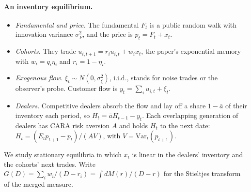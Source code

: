 \paragraph{An inventory equilibrium.}
\begin{itemize}[itemsep=1pt,topsep=2pt]
\item \emph{Fundamental and price.} The fundamental $F_t$ is a public random walk with innovation variance $\sigma_F^2$, and the price is $p_t=F_t+x_t$.
\item \emph{Cohorts.} They trade $u_{i,t+1}=r_iu_{i,t}+w_ix_t$, the paper's exponential memory with $w_i=q_i\eta_i$ and $r_i=1-\eta_i$.
\item \emph{Exogenous flow.} $\xi_t\sim N(0,\sigma_\xi^2)$, i.i.d., stands for noise trades or the observer's probe. Customer flow is $y_t=\sum_iu_{i,t}+\xi_t$.
\item \emph{Dealers.} Competitive dealers absorb the flow and lay off a share $1-\bar a$ of their inventory each period, so $H_t=\bar aH_{t-1}-y_t$. Each overlapping generation of dealers has CARA risk aversion $A$ and holds $H_t$ to the next date: $H_t=(E_tp_{t+1}-p_t)/(AV)$, with $V=\mathrm{Var}_t(p_{t+1})$.
\end{itemize}
We study stationary equilibria in which $x_t$ is linear in the dealers' inventory and the cohorts' next trades. Write $G(D)=\sum_iw_i/(D-r_i)=\int dM(r)/(D-r)$ for the Stieltjes transform of the merged measure.

